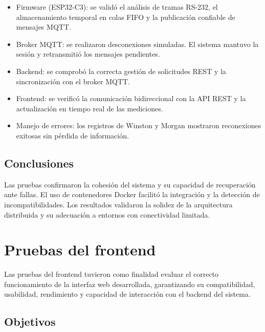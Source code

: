 \begin{itemize}
    \item Firmware (ESP32-C3): se validó el análisis de tramas RS-232, el almacenamiento temporal en colas FIFO y la publicación confiable de mensajes MQTT.  
    \item Broker MQTT: se realizaron desconexiones simuladas. El sistema mantuvo la sesión y retransmitió los mensajes pendientes.  
    \item Backend: se comprobó la correcta gestión de solicitudes REST y la sincronización con el broker MQTT.  
    \item Frontend: se verificó la comunicación bidireccional con la API REST y la actualización en tiempo real de las mediciones.  
    \item Manejo de errores: los registros de Winston y Morgan mostraron reconexiones exitosas sin pérdida de información.  
\end{itemize}

\subsection{Conclusiones}

Las pruebas confirmaron la cohesión del sistema y su capacidad de recuperación ante fallas.  
El uso de contenedores Docker facilitó la integración y la detección de incompatibilidades.  
Los resultados validaron la solidez de la arquitectura distribuida y su adecuación a entornos con conectividad limitada.


\section{Pruebas del frontend}
\label{sec:pruebas-frontend}

Las pruebas del frontend tuvieron como finalidad evaluar el correcto funcionamiento de la interfaz web desarrollada, garantizando su compatibilidad, usabilidad, rendimiento y capacidad de interacción con el backend del sistema.  

\subsection{Objetivos}

